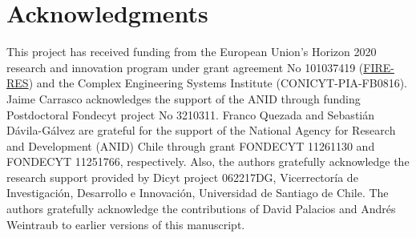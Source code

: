 \documentclass{itor}
\begin{document}



\section*{Acknowledgments}
This project has received funding from the European Union’s Horizon 2020 research and innovation program under grant agreement No 101037419 (\href{https://fire-res.eu}{FIRE-RES}) and the Complex Engineering Systems Institute (CONICYT-PIA-FB0816). Jaime Carrasco acknowledges the support of the ANID through funding Postdoctoral Fondecyt project No 3210311. Franco Quezada and Sebastián Dávila-Gálvez are grateful for the support of the National Agency for Research and Development (ANID) Chile through grant FONDECYT 11261130 and FONDECYT 11251766, respectively. Also, the authors gratefully acknowledge the research support provided by Dicyt project 062217DG, Vicerrector\'ia de Investigaci\'on, Desarrollo e Innovaci\'on, Universidad de Santiago de Chile. The authors gratefully acknowledge the contributions of David Palacios and Andr\'es Weintraub to earlier versions of this manuscript.
\end{document}
